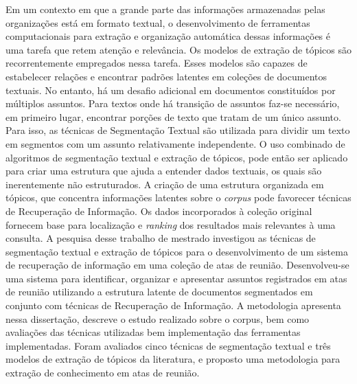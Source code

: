 Em um contexto em que a grande parte das informações armazenadas pelas organizações está em formato textual, o desenvolvimento de ferramentas computacionais para extração e organização automática dessas informações é uma tarefa que retem atenção e relevância.
%
Os modelos de extração de tópicos são recorrentemente empregados nessa tarefa. Esses modelos são capazes de estabelecer relações e encontrar padrões latentes em coleções de documentos textuais.
%
No entanto, há um desafio adicional em documentos constituídos por múltiplos assuntos. Para textos onde há transição de assuntos faz-se necessário, em primeiro lugar, encontrar porções de texto que tratam de um único assunto. Para isso, as técnicas de Segmentação Textual são utilizada para dividir um texto em segmentos com um assunto relativamente independente.
O uso combinado de algoritmos de segmentação textual e extração de tópicos, pode então ser aplicado para criar uma estrutura que ajuda a entender dados textuais, os quais são inerentemente não estruturados.
%
A criação de uma estrutura organizada em tópicos, que concentra informações latentes sobre o \textit{corpus} pode favorecer técnicas de Recuperação de Informação. Os dados incorporados à coleção original fornecem base para localização e \textit{ranking} dos resultados mais relevantes à uma consulta. 
% 
A pesquisa desse trabalho de mestrado investigou as técnicas de segmentação textual e extração de tópicos para o desenvolvimento de um sistema de recuperação de informação em uma coleção de atas de reunião. 
% 
Desenvolveu-se uma sistema para identificar, organizar e apresentar assuntos registrados em atas de reunião utilizando a estrutura latente de documentos segmentados em conjunto com técnicas de Recuperação de Informação.
% 
A metodologia apresenta nessa dissertação, descreve o estudo realizado sobre o corpus, bem como avaliações das técnicas utilizadas bem implementação das ferramentas implementadas. 
% 
Foram avaliados cinco técnicas de segmentação textual e três modelos de extração de tópicos da literatura, e proposto uma metodologia para extração de conhecimento em atas de reunião.
















